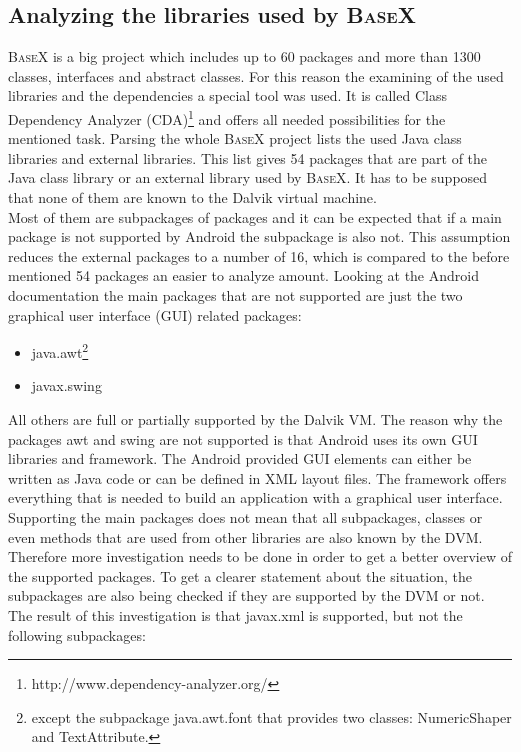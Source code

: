 \subsection{Analyzing the libraries used by \textsc{BaseX}}
\label{sec:migration:analyzing-the-libraries-used-by-basex}
\textsc{BaseX} is a big project which includes up to 60 packages and more than 1300 classes, interfaces and abstract classes.
For this reason the examining of the used libraries and the dependencies a special tool was used.
It is called Class Dependency Analyzer (CDA)\footnote{http://www.dependency-analyzer.org/} and offers all needed possibilities for the mentioned task.
Parsing the whole \textsc{BaseX} project lists the used Java class libraries and external libraries.
This list gives 54 packages that are part of the Java class library or an external library used by \textsc{BaseX}.
It has to be supposed that none of them are known to the Dalvik virtual machine.\\
Most of them are subpackages of packages and it can be expected that if a main package is not supported by Android the subpackage is also not. 
This assumption reduces the external packages to a number of 16, which is compared to the before mentioned 54 packages an easier to analyze amount.
Looking at the Android documentation the main packages that are not supported are just the two graphical user interface (GUI) related packages:
\begin{itemize}
  \item java.awt\footnote{except the subpackage java.awt.font that provides two classes: NumericShaper and TextAttribute.}
  \item javax.swing
\end{itemize}
All others are full or partially supported by the Dalvik VM.
The reason why the packages awt and swing are not supported is that Android uses its own GUI libraries and framework.
The Android provided GUI elements can either be written as Java code or can be defined in XML layout files.
The framework offers everything that is needed to build an application with a graphical user interface.\\
Supporting the main packages does not mean that all subpackages, classes or even methods that are used from other libraries are also known by the DVM.
Therefore more investigation needs to be done in order to get a better overview of the supported packages.
To get a clearer statement about the situation, the subpackages are also being checked if they are supported by the DVM or not.
The result of this investigation is that javax.xml is supported, but not the following subpackages:
